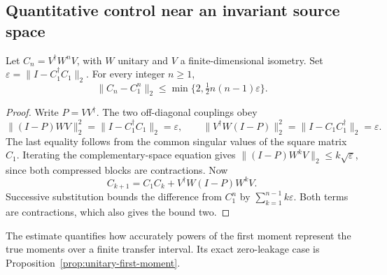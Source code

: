 \subsection{Quantitative control near an invariant source space}
\begin{proposition}\label{prop:source-leakage}
Let $C_n=V^\dagger W^nV$, with $W$ unitary and $V$ a finite-dimensional isometry. Set $\varepsilon=\|I-C_1^\dagger C_1\|_2$. For every integer $n\geq1$,
\begin{equation}\label{eq:source-leakage}
\|C_n-C_1^n\|_2\leq\min\{2,\tfrac12n(n-1)\varepsilon\}.
\end{equation}
\end{proposition}
\begin{proof}
Write $P=VV^\dagger$. The two off-diagonal couplings obey
\[
\|(I-P)WV\|_2^2=\|I-C_1^\dagger C_1\|_2=\varepsilon,
\qquad \|V^\dagger W(I-P)\|_2^2=\|I-C_1C_1^\dagger\|_2=\varepsilon.
\]
The last equality follows from the common singular values of the square matrix $C_1$. Iterating the complementary-space equation gives $\|(I-P)W^kV\|_2\leq k\sqrt\varepsilon$, since both compressed blocks are contractions. Now
\[
C_{k+1}=C_1C_k+V^\dagger W(I-P)W^kV.
\]
Successive substitution bounds the difference from $C_1^n$ by $\sum_{k=1}^{n-1}k\varepsilon$. Both terms are contractions, which also gives the bound two.
\end{proof}
The estimate quantifies how accurately powers of the first moment represent the true moments over a finite transfer interval. Its exact zero-leakage case is Proposition~\ref{prop:unitary-first-moment}.

